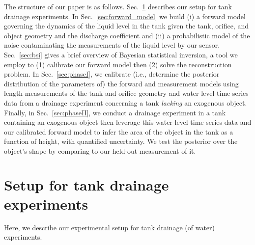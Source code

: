 \documentclass[openacc]{rsproca_new}%
\begin{document}

The structure of our paper is as follows. Sec.~\ref{sec:expt} describes our setup for tank drainage experiments.
In Sec.~\ref{sec:forward_model} we build (i) a forward model governing the dynamics of the liquid level in the tank given the tank, orifice, and object geometry and the discharge coefficient and (ii) a probabilistic model of the noise contaminating the measurements of the liquid level by our sensor.
Sec.~\ref{sec:bsi} gives a brief overview of Bayesian statistical inversion, a tool we employ to (1) calibrate our forward model then (2) solve the reconstruction problem.
In Sec.~\ref{sec:phaseI}, we calibrate (i.e., determine the posterior distribution of the parameters of) the forward and measurement models using length-measurements of the tank and orifice geometry and water level time series data from a drainage experiment concerning a tank \emph{lacking} an exogenous object. 
Finally, in Sec.~\ref{sec:phaseII}, we conduct a drainage experiment in a tank containing an exogenous object then leverage this water level time series data and our calibrated forward model to infer the area of the object in the tank as a function of height, with quantified uncertainty.
We test the posterior over the object's shape by comparing to our held-out measurement of it.

\section{Setup for tank drainage experiments} \label{sec:expt}
Here, we describe our experimental setup for tank drainage (of water) experiments.
\end{document}
